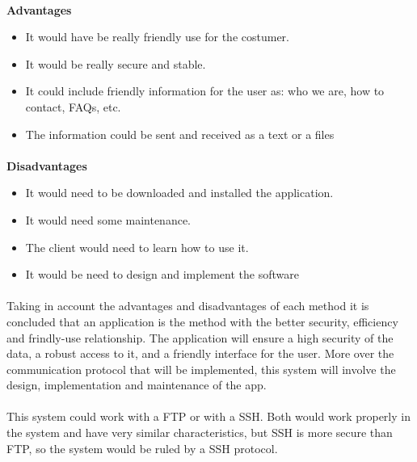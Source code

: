 \paragraph{} \textbf{Advantages}
\begin{itemize}
\item It would have be really friendly use for the costumer.
\item It would be really secure and stable.
\item It could include friendly information for the user as: who we are, how to contact, FAQs, etc.
\item The information could be sent and received as a text or a files

\end{itemize}
\paragraph{} \textbf{Disadvantages}
\begin{itemize}
\item It would need to be downloaded and installed the application.
\item It would need some maintenance.
\item The client would need to learn how to use it.
\item It would be need to design and implement the software
\end{itemize}


\paragraph{}
Taking in account the advantages and disadvantages of each method it is concluded that an application is the method with the better security, efficiency and frindly-use relationship. The application will ensure a high security of the data, a robust access to it, and a friendly interface for the user. More over the communication protocol that will be implemented, this system will involve the design, implementation and maintenance of the app. 
\paragraph{}
This system could work with a FTP or with a SSH. Both would work properly in the system and have very similar characteristics, but SSH is more secure than FTP, so the system would be ruled by a SSH protocol.



